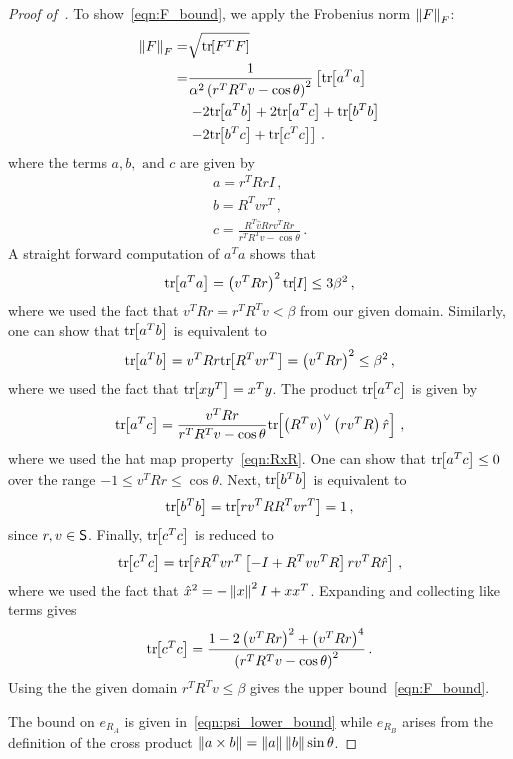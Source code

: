 \documentclass[letterpaper, 10 pt, conference]{ieeeconf}  %
\begin{document}
\begin{proof}[Proof of~]
	To show~\cref{eqn:F_bound}, we apply the Frobenius norm \( \left\| F \right\|_F \):
	\begin{align*}
		\left\| F \right\|_F =& \sqrt{\mathrm{tr}\negthickspace\left[ F^T F \right]} \\
		=& \frac{1}{\alpha ^2 \left( r^T R^T v - \cos \theta \right)^2} \left[\mathrm{tr}\negthickspace\left[ a^T a \right] \right.\\
		& \left.- 2 \mathrm{tr}\negthickspace\left[ a^T b \right] + 2 \mathrm{tr}\negthickspace\left[ a^T c  \right] + \mathrm{tr}\negthickspace\left[ b^T b \right] \right. \\
		&\left. - 2 \mathrm{tr}\negthickspace\left[ b^T c \right] + \mathrm{tr}\negthickspace\left[ c^T c \right]\right] \, .
	\end{align*}
	where the terms \( a, b, \text{ and } c \) are given by
	\begin{gather*}
		a = r^T R r I \, ,\\
		b = R^T v r^T \, ,\\
		c = \frac{R^T \hat{v} R r v^T R \hat{r}}{r^T R^T v - \cos \theta}\, .
	\end{gather*}
	A straight forward computation of \( a^T a \) shows that
	\begin{gather*}
		\mathrm{tr}\negthickspace\left[ a^T a \right] = \left( v^T R r \right)^2 \mathrm{tr}\negthickspace\left[ I \right] \leq 3 \beta^2 \, ,
	\end{gather*}
	where we used the fact that \( v^T R r = r^T R^T v < \beta \) from our given domain.
	Similarly, one can show that \( \mathrm{tr}\negthickspace\left[ a^T b \right] \) is equivalent to
	\begin{gather*}
		\mathrm{tr}\negthickspace\left[ a^T b \right] = v^T R r \mathrm{tr}\negthickspace\left[ R^T v r^T \right] = \left( v^T R r \right)^2 \leq \beta^2 \, ,
	\end{gather*} 
	where we used the fact that \( \mathrm{tr}\negthickspace\left[ x y^T \right] = x^T y \).
	The product \( \mathrm{tr}\negthickspace\left[ a^T c \right] \) is given by
	\begin{gather*}
		\mathrm{tr}\negthickspace\left[ a^T c \right] = \frac{v^T R r}{r^T R^T v - \cos \theta} \mathrm{tr}\negthickspace\left[ \left( R^T v \right)^\vee \left( r v^T R \right) \hat{r}  \right] \, ,
	\end{gather*}
	where we used the hat map property~\cref{eqn:RxR}.
	One can show that \(\mathrm{tr}\negthickspace\left[ a^T c \right] \leq 0 \) over the range \( -1 \leq v^T R r \leq \cos \theta \). 
	Next, \( \mathrm{tr}\negthickspace\left[ b^T b \right]\) is equivalent to
	\begin{gather*}
		\mathrm{tr}\negthickspace\left[ b^T b \right] = \mathrm{tr}\negthickspace\left[ r v^T R R^T v r^T \right] = 1 \, ,
	\end{gather*}
	since \( r,v \in \mathsf{S}\).
	Finally, \( \mathrm{tr}\negthickspace\left[ c^T c \right] \) is reduced to
	\begin{gather*}
		\mathrm{tr}\negthickspace\left[ c^T c \right] = \mathrm{tr}\negthickspace\left[ \hat{r} R^T v r^T \left[ -I + R^T v v^T R \right] r v^T R \hat{r} \right] \, ,
	\end{gather*}
	where we used the fact that \( \hat{x}^2 = - \left\| x \right\|^2 I + x x^T\).
	Expanding and collecting like terms gives
	\begin{gather*}
		\mathrm{tr}\negthickspace\left[ c^T c  \right] = \frac{1 - 2\left( v^T R r \right)^2 + \left( v^T R r \right)^4}{\left( r^T R^T v - \cos \theta \right)^2} \, . 
	\end{gather*}
	Using the the given domain \( r^T R^T v \leq \beta \) gives the upper bound~\cref{eqn:F_bound}.
	
	The bound on \( e_{R_A} \) is given in~\cref{eqn:psi_lower_bound} while \( e_{R_B} \) arises from the definition of the cross product \( \left\| a \times b \right\| = \left\| a \right\| \left\| b \right\| \sin \theta \).
\end{proof}
\end{document}
